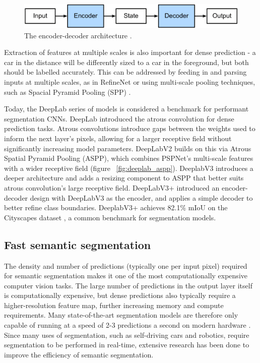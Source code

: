 \documentclass[a4paper,12pt]{report}
\begin{document}
\begin{figure}[ht]
    \centering
    \includegraphics[width=\textwidth]{res/encoder-decoder.png}
    \caption{The encoder-decoder architecture \cite{zhang_dive_2019}.}
    \label{fig:encoder_decoder}
\end{figure}

Extraction of features at multiple scales is also important for dense prediction - a car in the distance will be differently sized to a car in the foreground, but both should be labelled accurately. This can be addressed by feeding in and parsing inputs at multiple scales, as in RefineNet \cite{lin_refinenet_2016} or using multi-scale pooling techniques, such as Spacial Pyramid Pooling (SPP) \cite{he_spatial_2014}.

Today, the DeepLab series of models is considered a benchmark for performant segmentation CNNs. DeepLab \cite{chen_semantic_2016} introduced the atrous convolution for dense prediction tasks. Atrous convolutions introduce gaps between the weights used to inform the next layer’s pixels, allowing for a larger receptive field without significantly increasing model parameters. DeepLabV2 \cite{chen_deeplab_2017} builds on this via Atrous Spatial Pyramid Pooling (ASPP), which combines PSPNet’s \cite{zhao_pyramid_2017} multi-scale features with a wider receptive field (figure ~\ref{fig:deeplab_aspp}). DeeplabV3 \cite{chen_rethinking_2017} introduces a deeper architecture and adds a resizing component to ASPP that better suits atrous convolution’s large receptive field. DeepLabV3+ \cite{chen_encoder-decoder_2018} introduced an encoder-decoder design with DeepLabV3 as the encoder, and applies a simple decoder to better refine class boundaries. DeeplabV3+ achieves 82.1\% mIoU on the Cityscapes dataset \cite{cordts_cityscapes_2016}, a common benchmark for segmentation models.

\subsection{Fast semantic segmentation}
The density and number of predictions (typically one per input pixel) required for semantic segmentation makes it one of the most computationally expensive computer vision tasks. The large number of predictions in the output layer itself is computationally expensive, but dense predictions also typically require a higher-resolution feature map, further increasing memory and compute requirements. Many state-of-the-art segmentation models are therefore only capable of running at a speed of 2-3 predictions a second on modern hardware \cite{zhao_icnet_2018}. Since many uses of segmentation, such as self-driving cars and robotics, require segmentation to be performed in real-time, extensive research has been done to improve the efficiency of semantic segmentation.
\end{document}
